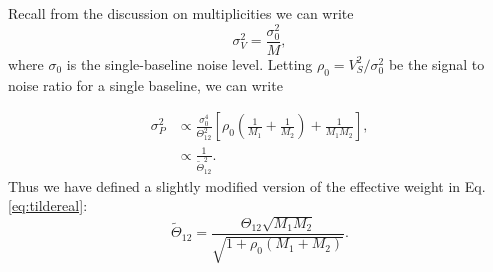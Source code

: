 \documentclass[twocolumn,apj,numberedappendix]{emulateapj}
\renewcommand\[{\begin{equation}}
\renewcommand\]{\end{equation}}
\begin{document}
Recall from the discussion on multiplicities we can write
\begin{equation}
\sigma_V^2=\frac{\sigma_0^2}{M},
\end{equation}
where $\sigma_0$ is the single-baseline noise level. Letting $\rho_0=V_S^2/\sigma_0^2$ be the signal to noise ratio for a single baseline, we can write

\begin{equation}
\begin{aligned}
\sigma_P^2 & \propto  \frac{\sigma_0^4}{\Theta_{12}^2} \left[ \rho_0 \left(\frac{1}{M_1}+\frac{1}{M_2} \right) + \frac{1}{M_1 M_2}\right], \\
&\propto \frac{1}{\widetilde{\Theta}_{12}^2}.
\end{aligned}
\end{equation}
Thus we have defined a slightly modified version of the effective weight in Eq.  \eqref{eq:tildereal}:
\begin{equation}
\widetilde{\Theta}_{12}=\frac{\Theta_{12}\sqrt{M_1M_{2}}}{\sqrt{1 + \rho_0 \left(M_1+M_{2} \right)}}.
\end{equation}







\end{document}
